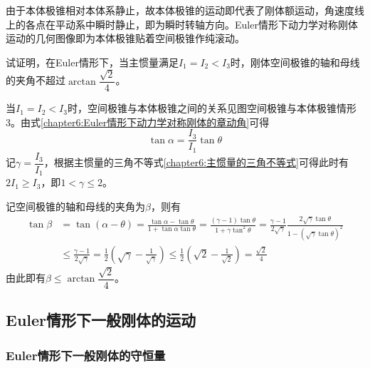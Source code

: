 由于本体极锥相对本体系静止，故本体极锥的运动即代表了刚体额运动，角速度线上的各点在平动系中瞬时静止，即为瞬时转轴方向。Euler情形下动力学对称刚体运动的几何图像即为本体极锥贴着空间极锥作纯滚动。

\begin{example}
试证明，在Euler情形下，当主惯量满足$I_1=I_2<I_3$时，刚体空间极锥的轴和母线的夹角不超过$\arctan\dfrac{\sqrt{2}}{4}$。
\end{example}
\begin{solution}
当$I_1=I_2<I_3$时，空间极锥与本体极锥之间的关系见图{空间极锥与本体极锥情形3}。由式\eqref{chapter6:Euler情形下动力学对称刚体的章动角}可得
\begin{equation*}
	\tan\alpha=\frac{I_3}{I_1}\tan\theta
\end{equation*}
记$\gamma=\dfrac{I_3}{I_1}$，根据主惯量的三角不等式\eqref{chapter6:主惯量的三角不等式}可得此时有$2I_1\geqslant I_3$，即$1<\gamma\leqslant 2$。

记空间极锥的轴和母线的夹角为$\beta$，则有
\begin{align*}
	\tan\beta & = \tan(\alpha-\theta) = \frac{\tan\alpha-\tan\theta}{1+\tan\alpha\tan\theta} = \frac{(\gamma-1)\tan\theta}{1+\gamma\tan^2\theta} = \frac{\gamma-1}{2\sqrt{\gamma}}\frac{2\sqrt{\gamma}\tan\theta}{1-(\sqrt{\gamma}\tan\theta)^2} \\
	& \leqslant \frac{\gamma-1}{2\sqrt{\gamma}} = \frac12 \left(\sqrt{\gamma}-\frac{1}{\sqrt{\gamma}}\right) \leqslant \frac12 \left(\sqrt{2}-\frac{1}{\sqrt{2}}\right) = \frac{\sqrt{2}}{4}
\end{align*}
由此即有$\beta\leqslant \arctan\dfrac{\sqrt{2}}{4}$。
\end{solution}

\subsection{Euler情形下一般刚体的运动}

\subsubsection{Euler情形下一般刚体的守恒量}

